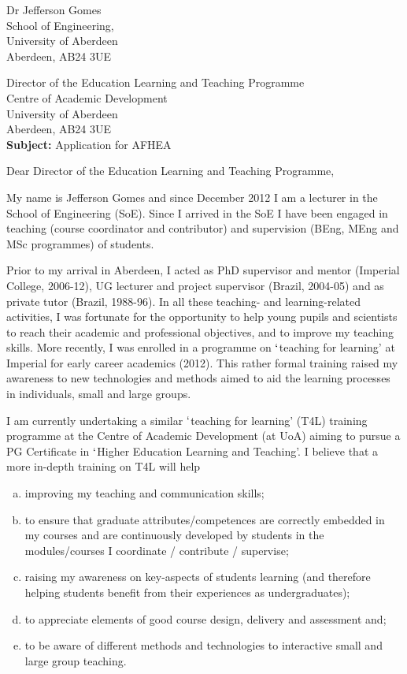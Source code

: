 \documentclass[14pt,twoside]{article}
\begin{document}
\begin{flushright}
Dr Jefferson Gomes\\
School of Engineering, \\
University of Aberdeen\\
Aberdeen, AB24 3UE
\end{flushright}

\begin{flushleft}
Director of the Education Learning and Teaching Programme\\
Centre of Academic Development\\
University of Aberdeen\\
Aberdeen, AB24 3UE\\
{\bf Subject:} Application for AFHEA
\end{flushleft}

\noindent
Dear Director of the Education Learning and Teaching Programme,

My name is Jefferson Gomes and since December 2012 I am a lecturer in the School of Engineering (SoE). Since I arrived in the SoE I have been engaged in teaching (course coordinator and contributor) and supervision (BEng, MEng and MSc programmes) of students. 

Prior to my arrival in Aberdeen, I acted as PhD supervisor and mentor (Imperial College, 2006-12), UG lecturer and project supervisor (Brazil, 2004-05) and as private tutor (Brazil, 1988-96). In all these teaching- and learning-related activities, I was fortunate for the opportunity to help young pupils and scientists to reach their academic and professional objectives, and to improve my teaching skills. More recently, I was enrolled in a programme on $\lq$teaching for learning' at Imperial for early career academics (2012). This rather formal training raised my awareness to new technologies and methods aimed to aid the learning processes in individuals, small and large groups. 

I am currently undertaking a similar $\lq$teaching for learning' (T4L) training programme at the Centre of Academic Development (at UoA) aiming to pursue a PG Certificate in $\lq$Higher Education Learning and Teaching'. I believe that a more in-depth training on T4L will help
\begin{enumerate} [(a)]
\item improving my teaching and communication skills; 
\item to ensure that graduate attributes/competences are correctly embedded in my courses and are continuously developed by students in the modules/courses I coordinate / contribute / supervise; 
\item raising my awareness on key-aspects of students learning (and therefore helping students benefit from their experiences as undergraduates); 
\item to appreciate elements of good course design, delivery and assessment and;
\item to be aware of different methods and technologies to interactive small and large group teaching.
\end{enumerate} 
\end{document}
